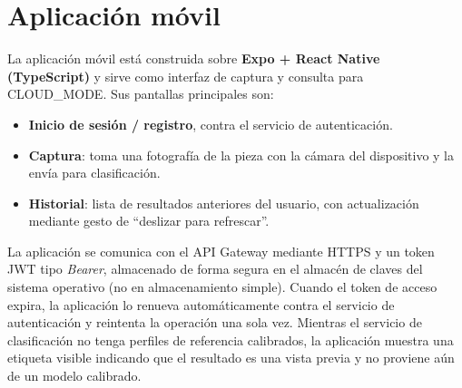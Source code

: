 \section{Aplicación móvil}
\label{sec:app_movil}

La aplicación móvil está construida sobre \textbf{Expo + React Native
(TypeScript)} y sirve como interfaz de captura y consulta para
CLOUD\_MODE. Sus pantallas principales son:

\begin{itemize}
  \item \textbf{Inicio de sesión / registro}, contra el servicio de
  autenticación.
  \item \textbf{Captura}: toma una fotografía de la pieza con la
  cámara del dispositivo y la envía para clasificación.
  \item \textbf{Historial}: lista de resultados anteriores del
  usuario, con actualización mediante gesto de ``deslizar para
  refrescar''.
\end{itemize}

La aplicación se comunica con el API Gateway mediante HTTPS y un token
JWT tipo \textit{Bearer}, almacenado de forma segura en el almacén de
claves del sistema operativo (no en almacenamiento simple). Cuando el
token de acceso expira, la aplicación lo renueva automáticamente contra
el servicio de autenticación y reintenta la operación una sola vez.
Mientras el servicio de clasificación no tenga perfiles de referencia
calibrados, la aplicación muestra una etiqueta visible indicando que el
resultado es una vista previa y no proviene aún de un modelo
calibrado.
